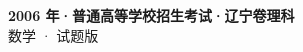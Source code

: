 \documentclass[zihao=-4, a4paper]{ctexart}
\begin{document}
\begin{center}
  {\Large\bfseries 2006 年·普通高等学校招生考试·辽宁卷理科}\\[4pt]
  {\large 数学 · 试题版}
\end{center}
\medskip
{}

\end{document}
